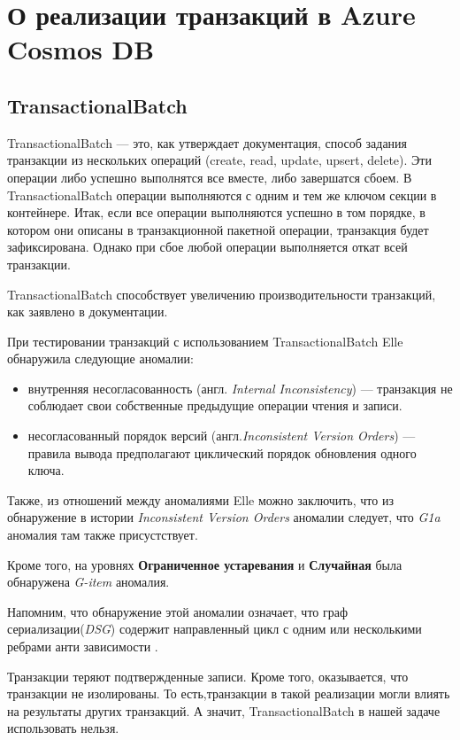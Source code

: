 \documentclass[12pt,  openany]{book}
\begin{document}
\section{О реализации транзакций в Azure Cosmos DB}
\subsection{TransactionalBatch}
TransactionalBatch --- это, как утверждает документация, способ задания транзакции из нескольких операций (create, read, update, upsert, delete). Эти операции либо успешно выполнятся все вместе, либо завершатся сбоем.  В TransactionalBatch операции выполняются с одним и тем же ключом секции в контейнере.  Итак, если все операции выполняются успешно в том порядке, в котором они описаны в транзакционной пакетной операции, транзакция будет зафиксирована. Однако при сбое любой операции выполняется откат всей транзакции.
\par TransactionalBatch способствует увеличению производительности транзакций, как заявлено в документации.

\par При тестировании транзакций с использованием TransactionalBatch Elle обнаружила следующие аномалии:
\begin{itemize}
\item внутренняя несогласованность (англ. \textit{Internal Inconsistency}) --- транзакция не соблюдает свои собственные предыдущие операции чтения и записи.
\item несогласованный порядок версий (англ.\textit{Inconsistent Version Orders}) --- правила вывода предполагают циклический порядок обновления одного ключа.
\end{itemize}

Также, из отношений между аномалиями Elle\cite{Kingsbury2020ElleII} можно заключить, что из обнаружение в истории  \textit{Inconsistent Version Orders} аномалии следует, что \textit{G1a} аномалия там также присустствует.
\par Кроме того, на уровнях \textbf{Ограниченное устаревания} и \textbf{Случайная} была обнаружена \textit{G-item} аномалия. 
\par Напомним, что обнаружение этой аномалии означает, что граф сериализации(\textit{DSG}) содержит направленный цикл с одним или несколькими ребрами анти зависимости \cite{IsolationLevelDefinitions}.

\par Транзакции теряют подтвержденные записи.  Кроме того, оказывается, что транзакции не изолированы. То есть,транзакции в такой реализации могли влиять на результаты других транзакций.
А значит, TransactionalBatch в нашей задаче использовать нельзя.
\end{document}
